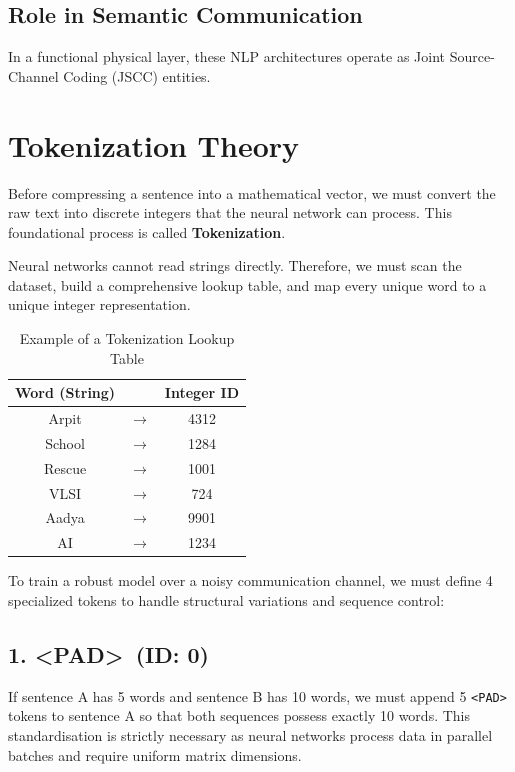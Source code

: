 \documentclass[10pt, conference]{IEEEtran}
\begin{document}
\subsection{\textbf{Role in Semantic Communication}}
In a functional physical layer, these NLP architectures operate as Joint Source-Channel Coding (JSCC) entities. 

\section{\large \textbf{Tokenization Theory}}

Before compressing a sentence into a mathematical vector, we must convert the raw text into discrete integers that the neural network can process. This foundational process is called \textbf{Tokenization}. 

Neural networks cannot read strings directly. Therefore, we must scan the dataset, build a comprehensive lookup table, and map every unique word to a unique integer representation.

\begin{table}[htbp]
\centering
\caption{Example of a Tokenization Lookup Table}
\label{tab:lookup_table}
\begin{tabular}{ccc}
\toprule
\textbf{Word (String)} & & \textbf{Integer ID} \\
\midrule
Arpit & $\rightarrow$ & 4312 \\
School & $\rightarrow$ & 1284 \\
Rescue & $\rightarrow$ & 1001 \\
VLSI & $\rightarrow$ & 724 \\
Aadya & $\rightarrow$ & 9901 \\
AI & $\rightarrow$ & 1234 \\
\bottomrule
\end{tabular}
\end{table}

To train a robust model over a noisy communication channel, we must define 4 specialized tokens to handle structural variations and sequence control:

\subsection{\textbf{1. \textless PAD\textgreater \ (ID: 0)}}
If sentence A has 5 words and sentence B has 10 words, we must append 5 \texttt{\textless PAD\textgreater} tokens to sentence A so that both sequences possess exactly 10 words. This standardisation is strictly necessary as neural networks process data in parallel batches and require uniform matrix dimensions.
\end{document}
